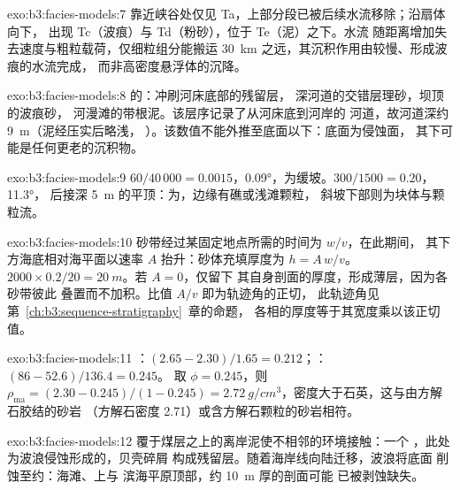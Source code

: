 \begin{solution}{exo:b3:facies-models:7}
靠近峡谷处仅见 Ta，上部分段已被后续水流移除；沿扇体向下，
出现 Tc（波痕）与 Td（粉砂），位于 Te（泥）之下。水流
随距离增加失去速度与粗粒载荷，仅细粒组分能搬运
\qty{30}{km} 之远，其沉积作用由较慢、形成波痕的水流完成，
而非高密度悬浮体的沉降。
\end{solution}

\begin{solution}{exo:b3:facies-models:8}
的：冲刷河床底部的残留层，
深河道的交错层理砂，坝顶的波痕砂，
河漫滩的带根泥。该层序记录了从河床底到河岸的
河道，故河道深约 \qty{9}{m}（泥经压实后略浅，
）。该数值不能外推至底面以下：底面为侵蚀面，
其下可能是任何更老的沉积物。
\end{solution}

\begin{solution}{exo:b3:facies-models:9}
$60/40\,000 = 0.0015$，\ang{0.09}，为缓坡。$300/1500 = 0.20$，\ang{11.3}，
后接深 \qty{5}{m} 的平顶：为，边缘有礁或浅滩颗粒，
斜坡下部则为块体与颗粒流。
\end{solution}

\begin{solution}{exo:b3:facies-models:10}
砂带经过某固定地点所需的时间为 $w/v$，在此期间，
其下方海底相对海平面以速率 $A$ 抬升：砂体充填厚度为 $h = A\,w/v$。
$2000\times0.2/20 = \qty{20}{m}$。若 $A = 0$，仅留下
其自身剖面的厚度，形成薄层，因为各砂带彼此
叠置而不加积。比值 $A/v$ 即为轨迹角的正切，
此轨迹角见第~\ref{ch:b3:sequence-stratigraphy}~章的命题，
各相的厚度等于其宽度乘以该正切值。
\end{solution}

\begin{solution}{exo:b3:facies-models:11}
：$(2.65 - 2.30)/1.65 = 0.212$；：$(86 - 52.6)/136.4 = 0.245$。
取 $\phi = 0.245$，则 $\rho_{\mathrm{ma}} = (2.30 - 0.245)/(1 - 0.245) =
\qty{2.72}{g/cm^3}$，密度大于石英，这与由方解石胶结的砂岩
（方解石密度 2.71）或含方解石颗粒的砂岩相符。
\end{solution}

\begin{solution}{exo:b3:facies-models:12}
覆于煤层之上的离岸泥使不相邻的环境接触：一个
，此处为波浪侵蚀形成的，贝壳碎屑
构成残留层。随着海岸线向陆迁移，波浪将底面
削蚀至约：海滩、上与
滨海平原顶部，约 \qty{10}{m} 厚的剖面可能
已被剥蚀缺失。
\end{solution}

